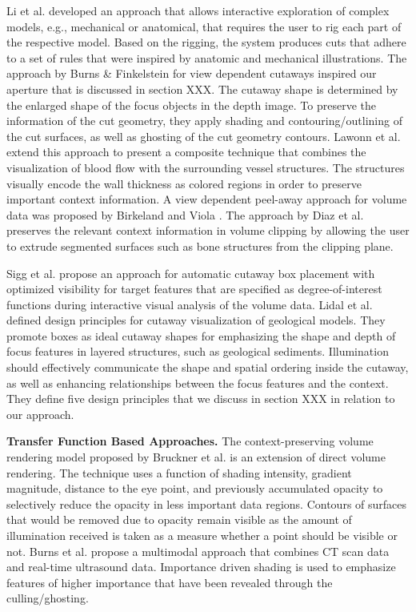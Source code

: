Li et al. \cite{Li07} developed an approach that allows interactive exploration of complex models, e.g., mechanical or anatomical, that requires the user to rig each part of the respective model. Based on the rigging, the system produces cuts that adhere to a set of rules that were inspired by anatomic and mechanical illustrations. 
The approach by Burns \& Finkelstein \cite{Burns08} for view dependent cutaways inspired our aperture that is discussed in section XXX. The cutaway shape is determined by the enlarged shape of the focus objects in the depth image. To preserve the information of the cut geometry, they apply shading and contouring/outlining of the cut surfaces, as well as ghosting of the cut geometry contours. Lawonn et al. \cite{lawonn16} extend this approach to present a composite technique that combines the visualization of blood flow with the surrounding vessel structures. The structures visually encode the wall thickness as colored regions in order to preserve important context information. A view dependent peel-away approach for volume data was proposed by Birkeland and Viola \cite{birkeland09}. The approach by Diaz et al. \cite{diaz12} preserves the relevant context information in volume clipping by allowing the user to extrude segmented surfaces such as bone structures from the clipping plane.

Sigg et al. \cite{sigg12} propose an approach for automatic cutaway box placement with optimized visibility for target features that are specified as degree-of-interest functions during interactive visual analysis of the volume data. Lidal et al. \cite{Lidal12} defined design principles for cutaway visualization of geological models. They promote boxes as ideal cutaway shapes for emphasizing the shape and depth of focus features in layered structures, such as geological sediments. Illumination should effectively communicate the shape and spatial ordering inside the cutaway, as well as enhancing relationships between the focus features and the context. They define five design principles that we discuss in section XXX in relation to our approach. 

\noindent
\textbf{Transfer Function Based Approaches.}
The context-preserving volume rendering model proposed by Bruckner et al. \cite{Bruckner05} is an extension of direct volume rendering. The technique uses a function of shading intensity, gradient magnitude, distance to the eye point, and previously accumulated opacity to selectively reduce the opacity in less important data regions. Contours of surfaces that would be removed due to opacity remain visible as the amount of illumination received is taken as a measure whether a point should be visible or not.
Burns et al. \cite{Burns07} propose a multimodal approach that combines CT scan data and real-time ultrasound data. Importance driven shading is used to emphasize features of higher importance that have been revealed through the culling/ghosting.

